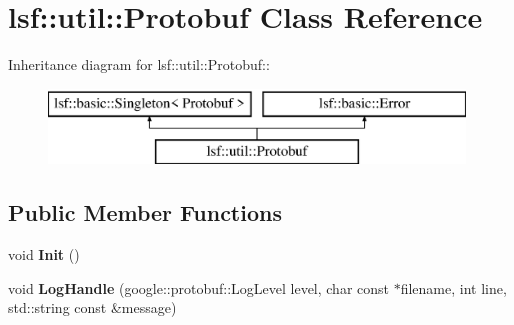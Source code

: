\hypertarget{classlsf_1_1util_1_1Protobuf}{
\section{lsf::util::Protobuf Class Reference}
\label{classlsf_1_1util_1_1Protobuf}
}
Inheritance diagram for lsf::util::Protobuf::\begin{figure}[H]
\begin{center}
\leavevmode
\includegraphics[height=2cm]{classlsf_1_1util_1_1Protobuf}
\end{center}
\end{figure}
\subsection*{Public Member Functions}
\begin{DoxyCompactItemize}
\item 
\hypertarget{classlsf_1_1util_1_1Protobuf_a229c631d62aa488b76adc22eb9e8a560}{
void {\bfseries Init} ()}
\label{classlsf_1_1util_1_1Protobuf_a229c631d62aa488b76adc22eb9e8a560}

\item 
\hypertarget{classlsf_1_1util_1_1Protobuf_a1682ce25f0d25bfdbcdb0208619da0c6}{
void {\bfseries LogHandle} (google::protobuf::LogLevel level, char const $\ast$filename, int line, std::string const \&message)}
\label{classlsf_1_1util_1_1Protobuf_a1682ce25f0d25bfdbcdb0208619da0c6}

\end{DoxyCompactItemize}
